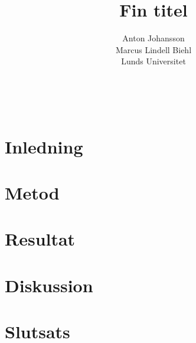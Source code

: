 \documentclass[a4paper]{article}
\title{Fin titel}
\author{Anton Johansson\\Marcus Lindell Biehl\\Lunds Universitet}
\makeatletter
\renewcommand*\maketitle{
  {
    \begin{center}
      {\huge\bfseries \@title}\\
      \vspace{5mm}
      {\large \@author}
    \end{center}
    \vspace{2mm}
  }
}
\makeatother
\begin{document}
\maketitle

\begin{abstract}
\end{abstract}

\vspace{2mm}

\section{Inledning}

\section{Metod}

\section{Resultat}

\section{Diskussion}

\section{Slutsats}
\end{document}
